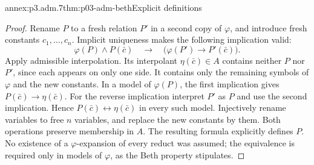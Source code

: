 \begin{annexitem}{annex:p3.adm.7}{thm:p03-adm-beth}{Explicit definitions}
\begin{proof}
Rename \(P\) to a fresh relation \(P'\) in a second copy of
\(\varphi\), and introduce fresh constants \(c_1,\ldots,c_n\). Implicit
uniqueness makes the following implication valid:
\[
 \varphi(P)\land P(\bar c)
 \quad\longrightarrow\quad
 \bigl(\varphi(P')\longrightarrow P'(\bar c)\bigr).
\]
Apply admissible interpolation. Its interpolant \(\eta(\bar c)\in A\)
contains neither \(P\) nor \(P'\), since each appears on only one side.
It contains only the remaining symbols of \(\varphi\) and the new
constants. In a model of \(\varphi(P)\), the first implication gives
\(P(\bar c)\to\eta(\bar c)\). For the reverse implication interpret
\(P'\) as \(P\) and use the second implication. Hence
\(P(\bar c)\leftrightarrow\eta(\bar c)\) in every such model.
Injectively rename variables to free \(n\) variables, and replace the
new constants by them. Both operations preserve membership in \(A\).
The resulting formula explicitly defines \(P\). No existence of a
\(\varphi\)-expansion of every reduct was assumed; the equivalence is
required only in models of \(\varphi\), as the Beth property stipulates.
\end{proof}
\end{annexitem}

